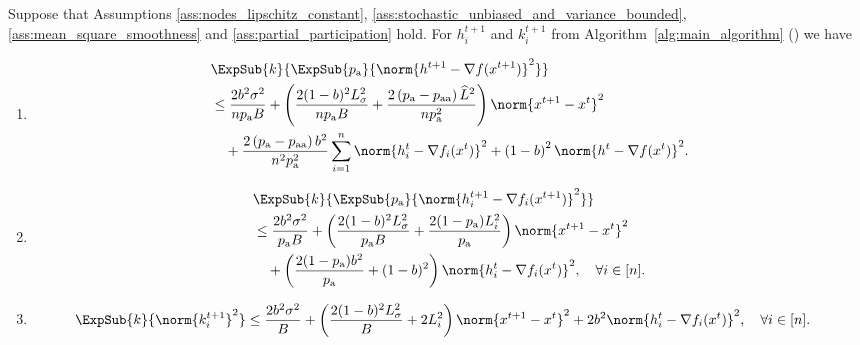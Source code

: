 \documentclass{article}
\newcommand{\algorithmname}{DASHA-PP}
\newcommand*{\probavailable}{\ensuremath{p_{\textnormal{a}}}}
\newcommand*{\probpairaa}{\ensuremath{p_{\textnormal{aa}}}}
\begin{document}
\begin{lemma}
  \label{lemma:gradient_mvr}
  Suppose that Assumptions \ref{ass:nodes_lipschitz_constant}, \ref{ass:stochastic_unbiased_and_variance_bounded}, \ref{ass:mean_square_smoothness} and \ref{ass:partial_participation} hold. For $h^{t+1}_i$ and $k^{t+1}_i$ from Algorithm~\ref{alg:main_algorithm} (\algname{\algorithmname-MVR}) we have
  \begin{enumerate}
  \item
      \begin{align*}
          &\ExpSub{k}{\ExpSub{\probavailable}{\norm{h^{t+1} - \nabla f(x^{t+1})}^2}} \\
          & \leq \frac{2 b^2 \sigma^2}{n \probavailable B} + \left(\frac{2 (1 - b)^2 L_{\sigma}^2}{n \probavailable B} + \frac{2\left(\probavailable - \probpairaa\right) \widehat{L}^2}{n \probavailable^2} \right) \norm{x^{t+1} - x^{t}}^2\\
          &\quad + \frac{2 \left(\probavailable - \probpairaa\right) b^2}{n^2 \probavailable^2} \sum_{i=1}^n \norm{h^t_i - \nabla f_i(x^{t})}^2 + \left(1 - b\right)^2 \norm{h^{t} - \nabla f(x^{t})}^2.
      \end{align*}
  \item
      \begin{align*}
          &\ExpSub{k}{\ExpSub{\probavailable}{\norm{h^{t+1}_i - \nabla f_i(x^{t+1})}^2}} \\
          & \leq \frac{2 b^2 \sigma^2}{\probavailable B}  + \left(\frac{2 (1 - b)^2 L_{\sigma}^2}{\probavailable B} + \frac{2(1 - \probavailable) L_i^2}{\probavailable}\right)\norm{x^{t+1} - x^{t}}^2 \\
          &\quad + \left(\frac{2 (1 - \probavailable) b^2}{\probavailable} + (1 - b)^2\right)\norm{h^t_i - \nabla f_i(x^{t})}^2, \quad \forall i \in [n].
      \end{align*}
  \item
      \begin{align*}
        &\ExpSub{k}{\norm{k^{t+1}_i}^2} \leq \frac{2 b^2 \sigma^2}{B} + \left(\frac{2 (1 - b)^2 L_{\sigma}^2}{B} + 2 L_i^2\right)\norm{x^{t+1} - x^{t}}^2 + 2 b^2 \norm{h^t_i - \nabla f_i(x^{t})}^2, \quad \forall i \in [n].
      \end{align*}
  \end{enumerate}
\end{lemma}
\end{document}
